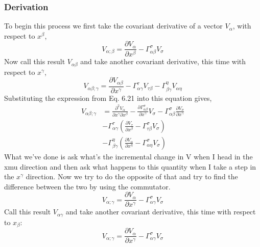 \subsubsection{Derivation}
To begin this process we first take the covariant derivative of a vector $V_{\alpha}$, with respect to $x^{\beta}$,
\begin{equation}
	V_{\alpha ; \beta} = \frac{\partial V_{\alpha}}{\partial x^{\beta}} - \Gamma^{\sigma}_{\alpha \beta} V_{\sigma}
\end{equation}
Now call this result $V_{\alpha \beta}$ and take another covariant derivative, this time with
respect to $x^{\gamma}$,
\begin{equation}
	V_{\alpha \beta; \gamma} = \frac{\partial V_{\alpha \beta }}{\partial x^{\gamma}} - \Gamma^{\tau}_{\alpha \gamma} V_{\tau \beta} - \Gamma^{\eta}_{\beta \gamma} V_{\alpha \eta	} 
\end{equation}
Substituting the expression from Eq. 6.21 into this equation gives,
\begin{equation} \label{eq1}
\begin{split}
V_{\alpha \beta; \gamma} & = \frac{\partial^{2} V_{\alpha}}{\partial x^{\gamma} \partial x^{\beta}} - \frac{\partial \Gamma^{\sigma}_{\alpha \beta}}{\partial x^{\gamma}}V_{\sigma}- \Gamma^{\sigma}_{\alpha \beta} \frac{\partial V_{\sigma}}{\partial x^{\gamma}} \\
& - \Gamma^{\tau}_{\alpha \gamma} \left( \frac{\partial V_{\tau}}{\partial x^{\beta}} -\Gamma^{\sigma}_{\tau \beta} V_{\sigma} \right)\\
& - \Gamma^{\eta}_{\beta \gamma} \left( \frac{\partial V_{\alpha}}{\partial x^{\eta}} -\Gamma^{\sigma}_{\alpha \eta} V_{\sigma} \right)
\end{split}
\end{equation}
What  we've done is ask what's the incremental change in V when I head in the xmu direction and then ask what happens to this quantity when I take a step in the $x^{\gamma}$ direction. Now we try to do the opposite of that and try to find the difference between the two by using the commutator.
\begin{equation}
V_{\alpha ; \gamma} = \frac{\partial V_{\alpha}}{\partial x^{\gamma}} - \Gamma^{\sigma}_{\alpha \gamma} V_{\sigma}
\end{equation}
Call this result $V_{\alpha \gamma}$ and take another covariant derivative, this time with respect to $x_{\beta}$:
\begin{equation}
V_{\alpha ; \gamma} = \frac{\partial V_{\alpha}}{\partial x^{\gamma}} - \Gamma^{\sigma}_{\alpha \gamma} V_{\sigma}
\end{equation}
